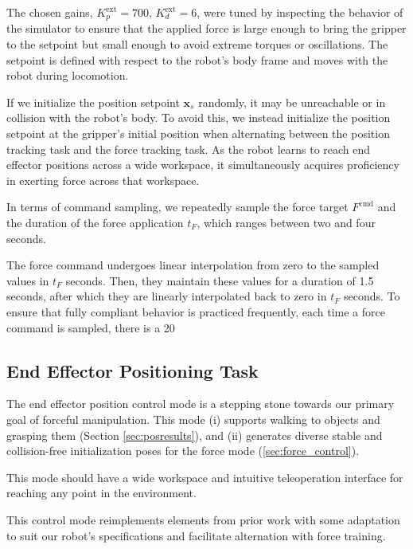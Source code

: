 The chosen gains, $K_p^\textrm{ext} = 700$, $K_d^\textrm{ext} = 6$, were tuned by inspecting the behavior of the simulator to ensure that the applied force is large enough to bring the gripper to the setpoint but small enough to avoid extreme torques or oscillations. The setpoint is defined with respect to the robot's body frame and moves with the robot during locomotion.

If we initialize the position setpoint $\mathbf{x}_s$ randomly, it may be unreachable or in collision with the robot's body. To avoid this, we instead initialize the position setpoint at the gripper's initial position when alternating between the position tracking task and the force tracking task. As the robot learns to reach end effector positions across a wide workspace, it simultaneously acquires proficiency in exerting force across that workspace.

In terms of command sampling, we repeatedly sample the force target $F^\textrm{cmd}$ and the duration of the force application $t_F$, which ranges between two and four seconds.

The force command undergoes linear interpolation from zero to the sampled values in $t_F$ seconds. Then, they maintain these values for a duration of 1.5 seconds, after which they are linearly interpolated back to zero in $t_F$ seconds. To ensure that fully compliant behavior is practiced frequently, each time a force command is sampled, there is a 20\

\subsection{End Effector Positioning Task} 
\label{sec:eepos_loc_task}
The end effector position control mode is a stepping stone towards our primary goal of forceful manipulation. This mode  (i) supports walking to objects and grasping them (Section \ref{sec:posresults}), and 
(ii) generates diverse stable and collision-free initialization poses for the force mode (\ref{sec:force_control}).

This mode should have a wide workspace and intuitive teleoperation interface for reaching any point in the environment. 

This control mode reimplements elements from prior work \cite{fu2023deep} with some adaptation to suit our robot's specifications and facilitate alternation with force training.


